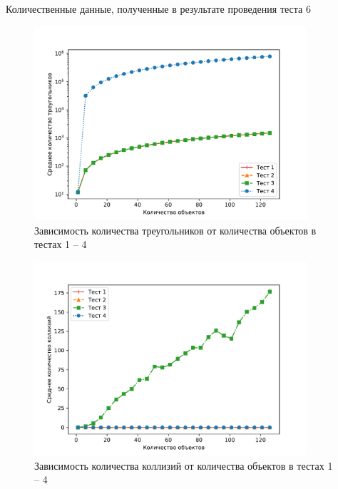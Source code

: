 \begin{table}[H]
    \caption{Количественные данные, полученные в результате проведения теста 6}
    \label{tab:test6}
    \begin{adjustbox}{width=1\textwidth}
        
    \end{adjustbox}
\end{table}

\begin{figure}[H]
	\centering
    \includegraphics[width=0.9\textwidth]{img/1234/plot_triangles.pdf}
	\caption{Зависимость количества треугольников от количества объектов в тестах 1 -- 4}
	\label{fig:1234:tr}
\end{figure}

\begin{figure}[H]
	\centering
    \includegraphics[width=0.9\textwidth]{img/1234/plot_collisions.pdf}
	\caption{Зависимость количества коллизий от количества объектов в тестах 1 -- 4}
	\label{fig:1234:col}
\end{figure}

